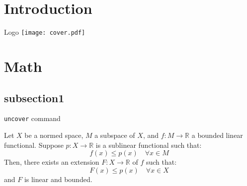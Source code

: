 \documentclass[
    ref = refDemo,
    style = 2,
    sectionpagestyle = 1
]{spBeamer}
\begin{document}
    \section{Introduction}
        \begin{frame}{Logo}
                \texttt{[image: cover.pdf]}
        \end{frame}

    \section{Math}
        \subsection{subsection1}
            \begin{frame}{\texttt{uncover} command}
            \end{frame}

            \begin{frame}
                \begin{theorem}
                    Let \( X \) be a normed space, \( M \) a subspace of \( X \), and \( f: M \to \mathbb{R} \) a bounded linear functional. Suppose \( p: X \to \mathbb{R} \) is a sublinear functional such that:
                    \[
                    f(x) \leq p(x) \quad \forall x \in M
                    \]
                    Then, there exists an extension \( F: X \to \mathbb{R} \) of \( f \) such that:
                    \[
                    F(x) \leq p(x) \quad \forall x \in X
                    \]
                    and \( F \) is linear and bounded.
                \end{theorem}
            \end{frame}
\end{document}
